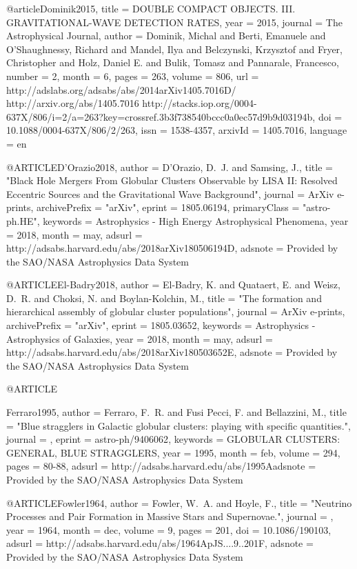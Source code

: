 \documentclass[twocolumn,tighten]{aastex63}
\begin{document}
{{{{{@article{Dominik2015,
    title = {{DOUBLE COMPACT OBJECTS. III. GRAVITATIONAL-WAVE DETECTION RATES}},
    year = {2015},
    journal = {The Astrophysical Journal},
    author = {Dominik, Michal and Berti, Emanuele and O’Shaughnessy, Richard and Mandel, Ilya and Belczynski, Krzysztof and Fryer, Christopher and Holz, Daniel E. and Bulik, Tomasz and Pannarale, Francesco},
    number = {2},
    month = {6},
    pages = {263},
    volume = {806},
    url = {http://adslabs.org/adsabs/abs/2014arXiv1405.7016D/ http://arxiv.org/abs/1405.7016 http://stacks.iop.org/0004-637X/806/i=2/a=263?key=crossref.3b3f738540bccc0a0ec57d9b9d03194b},
    doi = {10.1088/0004-637X/806/2/263},
    issn = {1538-4357},
    arxivId = {1405.7016},
    language = {en}
}

@ARTICLE{D'Orazio2018,
   author = {{D'Orazio}, D.~J. and {Samsing}, J.},
    title = "{Black Hole Mergers From Globular Clusters Observable by LISA II: Resolved Eccentric Sources and the Gravitational Wave Background}",
  journal = {ArXiv e-prints},
archivePrefix = "arXiv",
   eprint = {1805.06194},
 primaryClass = "astro-ph.HE",
 keywords = {Astrophysics - High Energy Astrophysical Phenomena},
     year = 2018,
    month = may,
   adsurl = {http://adsabs.harvard.edu/abs/2018arXiv180506194D},
  adsnote = {Provided by the SAO/NASA Astrophysics Data System}
}

@ARTICLE{El-Badry2018,
   author = {{El-Badry}, K. and {Quataert}, E. and {Weisz}, D.~R. and {Choksi}, N. and 
	{Boylan-Kolchin}, M.},
    title = "{The formation and hierarchical assembly of globular cluster populations}",
  journal = {ArXiv e-prints},
archivePrefix = "arXiv",
   eprint = {1805.03652},
 keywords = {Astrophysics - Astrophysics of Galaxies},
     year = 2018,
    month = may,
   adsurl = {http://adsabs.harvard.edu/abs/2018arXiv180503652E},
  adsnote = {Provided by the SAO/NASA Astrophysics Data System}
}

@ARTICLE{Ferraro1995,
   author = {{Ferraro}, F.~R. and {Fusi Pecci}, F. and {Bellazzini}, M.},
    title = "{Blue stragglers in Galactic globular clusters: playing with specific quantities.}",
  journal = {\aap},
   eprint = {astro-ph/9406062},
 keywords = {GLOBULAR CLUSTERS: GENERAL, BLUE STRAGGLERS},
     year = 1995,
    month = feb,
   volume = 294,
    pages = {80-88},
   adsurl = {http://adsabs.harvard.edu/abs/1995Aadsnote = {Provided by the SAO/NASA Astrophysics Data System}
}

@ARTICLE{Fowler1964,
   author = {{Fowler}, W.~A. and {Hoyle}, F.},
    title = "{Neutrino Processes and Pair Formation in Massive Stars and Supernovae.}",
  journal = {\apjs},
     year = 1964,
    month = dec,
   volume = 9,
    pages = {201},
      doi = {10.1086/190103},
   adsurl = {http://adsabs.harvard.edu/abs/1964ApJS....9..201F},
  adsnote = {Provided by the SAO/NASA Astrophysics Data System}
}

}}}}}}
\end{document}
